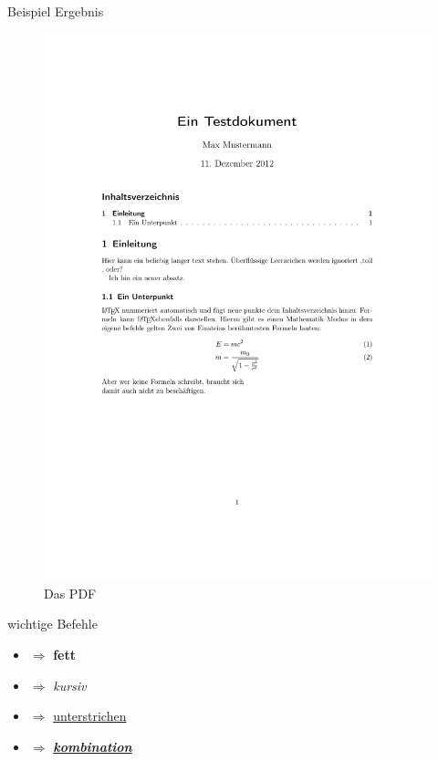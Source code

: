 \begin{frame}{Beispiel Ergebnis}
	\begin{figure}[tbph]
	\centering
	\includegraphics[height=\textheight]{./pictures/demonstration}
	\caption{Das PDF}
	\label{fig:demonstration}
	\end{figure}
\end{frame}

\begin{frame}{wichtige Befehle}
	\begin{itemize}[<+->]
	\item  $ \Rightarrow $ \textbf{fett}
	\item  $ \Rightarrow $ \textit{kursiv}
	\item  $ \Rightarrow $ \underline{unterstrichen}
	\item  $ \Rightarrow $ \textbf{\textit{\underline{kombination}}}
	\end{itemize}
\end{frame}

